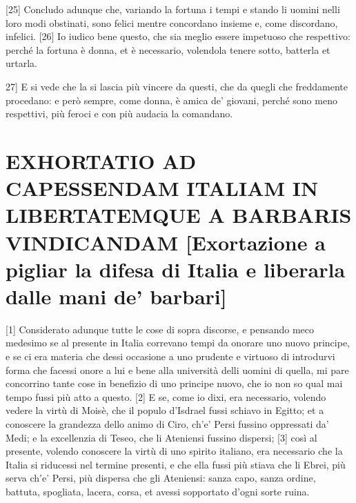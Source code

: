 {[}25{]} Concludo adunque che, variando la fortuna i tempi e stando li
uomini nelli loro modi obstinati, sono felici mentre concordano insieme
e, come discordano, infelici. {[}26{]} Io iudico bene questo, che sia
meglio essere impetuoso che respettivo: perché la fortuna è donna, et è
necessario, volendola tenere sotto, batterla et urtarla. \linebreak

\quebra

\noindent{}{[}27{]} E si
vede che la si lascia più vincere da questi, che da quegli che
freddamente procedano: e però sempre, come donna, è amica de' giovani,
perché sono meno respettivi, più feroci e con più audacia la comandano.

\quebra\section{EXHORTATIO AD CAPESSENDAM ITALIAM IN LIBERTATEMQUE A BARBARIS VINDICANDAM\break
{[}Exortazione a pigliar la difesa di Italia e liberarla dalle mani de' barbari{]}}

{[}1{]} Considerato adunque tutte le cose di sopra discorse, e pensando meco medesimo se al presente in Italia correvano tempi da onorare uno nuovo principe, e se ci era materia che dessi occasione a uno prudente e virtuoso di introdurvi forma che facessi onore a lui e bene alla università delli uomini di quella, mi pare concorrino tante cose in benefizio di uno principe nuovo, che io non so qual mai tempo fussi più atto a questo. {[}2{]} E se, come io dixi, era necessario, volendo vedere la virtù di Moisè, che il populo d'Isdrael fussi schiavo in Egitto; et a conoscere la grandezza dello animo di Ciro, ch'e' Persi fussino oppressati da' Medi; e la excellenzia di Teseo, che li Ateniensi fussino dispersi; {[}3{]} così al presente, volendo conoscere la virtù di uno spirito italiano, era necessario che la Italia si riducessi nel termine presenti, e che ella fussi più stiava che li Ebrei, più serva ch'e' Persi, più dispersa che gli Ateniensi: sanza capo, sanza ordine, battuta, spogliata, lacera, corsa, et avessi sopportato d'ogni sorte ruina.

